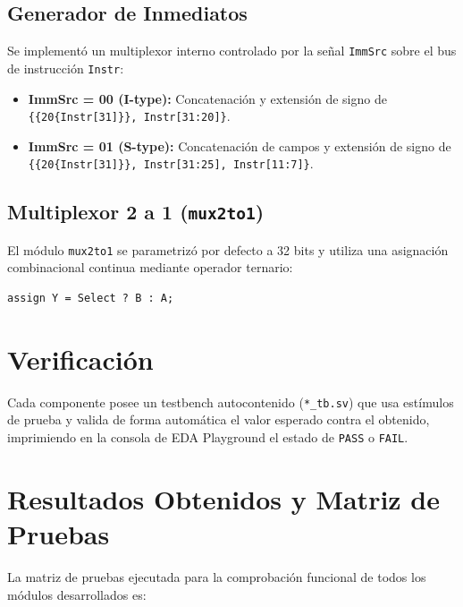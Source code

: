 \documentclass[12pt,a4paper]{article}
\begin{document}
\subsection{Generador de Inmediatos}
Se implementó un multiplexor interno controlado por la señal \texttt{ImmSrc} sobre el bus de instrucción \texttt{Instr}:
\begin{itemize}
    \item \textbf{ImmSrc = 00 (I-type):} Concatenación y extensión de signo de \texttt{\{\{20\{Instr[31]\}\}, Instr[31:20]\}}.
    \item \textbf{ImmSrc = 01 (S-type):} Concatenación de campos y extensión de signo de \texttt{\{\{20\{Instr[31]\}\}, Instr[31:25], Instr[11:7]\}}.
\end{itemize}

\subsection{Multiplexor 2 a 1 (\texttt{mux2to1})}
El módulo \texttt{mux2to1} se parametrizó por defecto a 32 bits y utiliza una asignación combinacional continua mediante operador ternario:
\begin{verbatim}
assign Y = Select ? B : A;
\end{verbatim}

\section{Verificación}
Cada componente posee un testbench autocontenido (\texttt{*\_tb.sv}) que usa estímulos de prueba y valida de forma automática el valor esperado contra el obtenido, imprimiendo en la consola de EDA Playground el estado de \texttt{PASS} o \texttt{FAIL}.

\newpage

\section{Resultados Obtenidos y Matriz de Pruebas}
La matriz de pruebas ejecutada para la comprobación funcional de todos los módulos desarrollados es:
\end{document}
